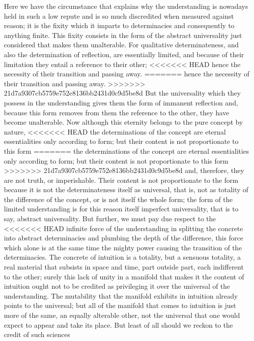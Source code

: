 Here we have the circumstance that explains
why the understanding is nowadays held in such a low repute
and is so much discredited when measured against reason;
it is the fixity which it imparts to determinacies
and consequently to anything finite.
This fixity consists in the form of the abstract universality
just considered that makes them unalterable.
For qualitative determinateness,
and also the determination of reflection,
are essentially limited,
and because of their limitation they entail a reference
to their other;
<<<<<<< HEAD
hence the necessity of their transition and passing away. 
=======
hence the necessity of their transition and passing away.
>>>>>>> 21d7a9307cb5759e752e8136bb2431d0c9d5be8d
But the universality which they possess in the understanding
gives them the form of immanent reflection
and, because this form removes from them
the reference to the other,
they have become unalterable.
Now although this eternity belongs
to the pure concept by nature,
<<<<<<< HEAD
the determinations of the concept are 
eternal essentialities only according to form;
but their content is not proportionate to this form 
=======
the determinations of the concept are
eternal essentialities only according to form;
but their content is not proportionate to this form
>>>>>>> 21d7a9307cb5759e752e8136bb2431d0c9d5be8d
and, therefore, they are not truth, or imperishable.
Their content is not proportionate to the form
because it is not the determinateness itself as universal,
that is, not as totality of the difference of the concept,
or is not itself the whole form;
the form of the limited understanding is
for this reason itself imperfect universality,
that is to say, abstract universality.
But further, we must pay due respect to the
<<<<<<< HEAD
infinite force of the understanding 
in splitting the concrete into abstract determinacies 
and plumbing the depth of the difference,
this force which alone is at the same time 
the mighty power causing the transition of the determinacies. 
The concrete of intuition is a totality,
but a sensuous totality, 
a real material that subsists in space and time,
part outside part, each indifferent to the other; 
surely this lack of unity in a manifold that
makes it the content of intuition ought not to be credited
as privileging it over the universal of the understanding. 
The mutability that the manifold exhibits 
in intuition already points to the universal;
but all of the manifold that comes to intuition is
just more of the same, an equally alterable other, 
not the universal that one would expect to appear and take its place.
But least of all should we reckon to the credit of such sciences
